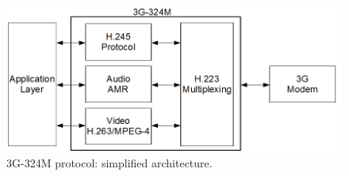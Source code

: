 \documentclass[10pt, conference, compsocconf]{IEEEtran}
\begin{document}







\begin{figure}[!htbp]
\centering
\includegraphics[scale=0.28]{pics/3g324m.jpg}
\caption{3G-324M protocol: simplified architecture.}
\label{fig:3g324}
\end{figure}
\end{document}
